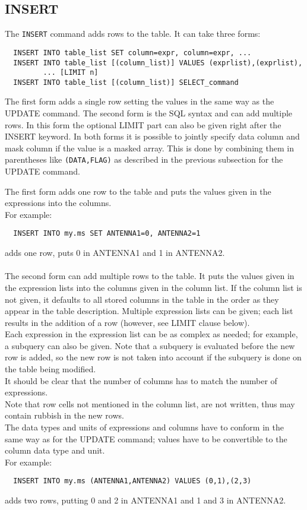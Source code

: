\subsection{INSERT}
The \texttt{INSERT} command adds rows to the table. It can take three forms:
\begin{verbatim}
  INSERT INTO table_list SET column=expr, column=expr, ...
  INSERT INTO table_list [(column_list)] VALUES (exprlist),(exprlist),
         ... [LIMIT n]
  INSERT INTO table_list [(column_list)] SELECT_command
\end{verbatim}
The first form adds a single row setting the values in the same way
as the UPDATE command. 
The second form is the SQL syntax and can add multiple rows. In this
form the optional LIMIT part can also be given right after the INSERT keyword.
In both forms it is possible to jointly specify
data column and mask column if the value is a masked array. This is
done by combining them in parentheses like {\tt (DATA,FLAG)} as
described in the previous subsection for the UPDATE command.

The first form adds one row to the table and puts the values given in
the expressions into the columns.
\\For example:
\begin{verbatim}
  INSERT INTO my.ms SET ANTENNA1=0, ANTENNA2=1
\end{verbatim}
adds one row, puts 0 in ANTENNA1 and 1 in ANTENNA2.

\paragraph*{}
The second form can add multiple rows to the table. It puts the values given in
the expression lists into the columns given in the column list.
If the column list is not given, it defaults to all stored columns in
the table in the order as they appear in the table description.
Multiple expression lists can be given; each list results in the
addition of a row (however, see LIMIT clause below).
\\Each expression in the expression list can be as complex as needed;
for example, a subquery can also be given. Note that a subquery is
evaluated before the new row is added, so the new row is not taken
into account if the subquery is done on the table being modified.
\\It should be clear that the number of columns has to match the
number of expressions.
\\Note that row cells not mentioned in the column list,
are not written, thus may contain rubbish in the new rows.
\\The data types and units of expressions and columns have to conform in
the same way 
as for the UPDATE command; values have to be convertible
to the column data type and unit.
\\For example:
\begin{verbatim}
  INSERT INTO my.ms (ANTENNA1,ANTENNA2) VALUES (0,1),(2,3)
\end{verbatim}
adds two rows, putting 0 and 2 in ANTENNA1 and 1 and 3 in ANTENNA2.

